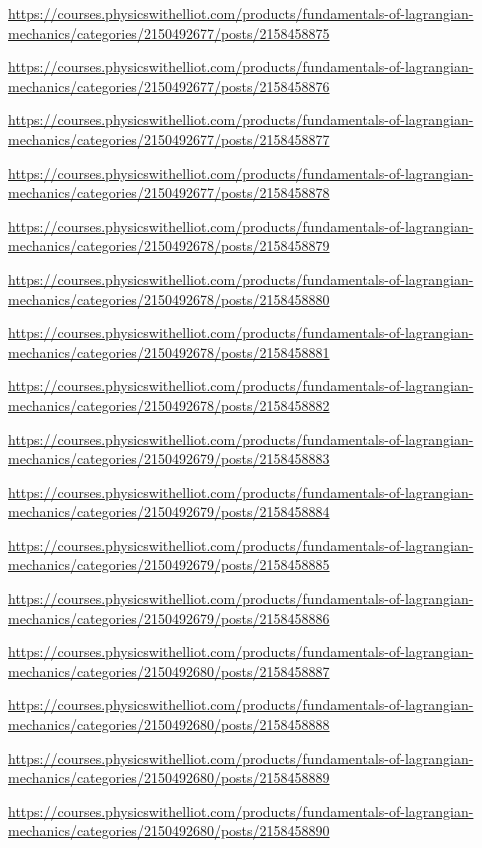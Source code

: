 \documentclass[
]{book}
\theoremstyle{definition}
\theoremstyle{definition}
\theoremstyle{definition}
\theoremstyle{definition}
\theoremstyle{remark}
\begin{document}
\url{https://courses.physicswithelliot.com/products/fundamentals-of-lagrangian-mechanics/categories/2150492677/posts/2158458875}

\url{https://courses.physicswithelliot.com/products/fundamentals-of-lagrangian-mechanics/categories/2150492677/posts/2158458876}

\url{https://courses.physicswithelliot.com/products/fundamentals-of-lagrangian-mechanics/categories/2150492677/posts/2158458877}

\url{https://courses.physicswithelliot.com/products/fundamentals-of-lagrangian-mechanics/categories/2150492677/posts/2158458878}

\url{https://courses.physicswithelliot.com/products/fundamentals-of-lagrangian-mechanics/categories/2150492678/posts/2158458879}

\url{https://courses.physicswithelliot.com/products/fundamentals-of-lagrangian-mechanics/categories/2150492678/posts/2158458880}

\url{https://courses.physicswithelliot.com/products/fundamentals-of-lagrangian-mechanics/categories/2150492678/posts/2158458881}

\url{https://courses.physicswithelliot.com/products/fundamentals-of-lagrangian-mechanics/categories/2150492678/posts/2158458882}

\url{https://courses.physicswithelliot.com/products/fundamentals-of-lagrangian-mechanics/categories/2150492679/posts/2158458883}

\url{https://courses.physicswithelliot.com/products/fundamentals-of-lagrangian-mechanics/categories/2150492679/posts/2158458884}

\url{https://courses.physicswithelliot.com/products/fundamentals-of-lagrangian-mechanics/categories/2150492679/posts/2158458885}

\url{https://courses.physicswithelliot.com/products/fundamentals-of-lagrangian-mechanics/categories/2150492679/posts/2158458886}

\url{https://courses.physicswithelliot.com/products/fundamentals-of-lagrangian-mechanics/categories/2150492680/posts/2158458887}

\url{https://courses.physicswithelliot.com/products/fundamentals-of-lagrangian-mechanics/categories/2150492680/posts/2158458888}

\url{https://courses.physicswithelliot.com/products/fundamentals-of-lagrangian-mechanics/categories/2150492680/posts/2158458889}

\url{https://courses.physicswithelliot.com/products/fundamentals-of-lagrangian-mechanics/categories/2150492680/posts/2158458890}
\end{document}
